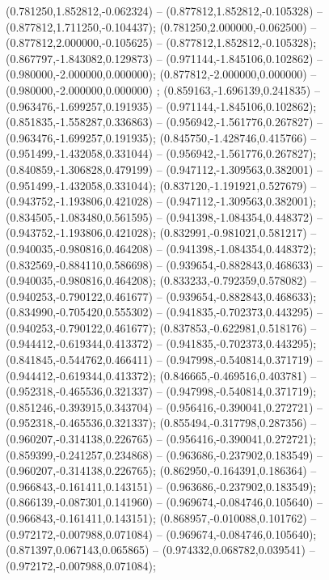  (0.781250,1.852812,-0.062324) -- (0.877812,1.852812,-0.105328) -- (0.877812,1.711250,-0.104437);
 (0.781250,2.000000,-0.062500) -- (0.877812,2.000000,-0.105625) -- (0.877812,1.852812,-0.105328);
 (0.867797,-1.843082,0.129873) -- (0.971144,-1.845106,0.102862) -- (0.980000,-2.000000,0.000000);
 (0.877812,-2.000000,0.000000) -- (0.980000,-2.000000,0.000000) ;
 (0.859163,-1.696139,0.241835) -- (0.963476,-1.699257,0.191935) -- (0.971144,-1.845106,0.102862);
 (0.851835,-1.558287,0.336863) -- (0.956942,-1.561776,0.267827) -- (0.963476,-1.699257,0.191935);
 (0.845750,-1.428746,0.415766) -- (0.951499,-1.432058,0.331044) -- (0.956942,-1.561776,0.267827);
 (0.840859,-1.306828,0.479199) -- (0.947112,-1.309563,0.382001) -- (0.951499,-1.432058,0.331044);
 (0.837120,-1.191921,0.527679) -- (0.943752,-1.193806,0.421028) -- (0.947112,-1.309563,0.382001);
 (0.834505,-1.083480,0.561595) -- (0.941398,-1.084354,0.448372) -- (0.943752,-1.193806,0.421028);
 (0.832991,-0.981021,0.581217) -- (0.940035,-0.980816,0.464208) -- (0.941398,-1.084354,0.448372);
 (0.832569,-0.884110,0.586698) -- (0.939654,-0.882843,0.468633) -- (0.940035,-0.980816,0.464208);
 (0.833233,-0.792359,0.578082) -- (0.940253,-0.790122,0.461677) -- (0.939654,-0.882843,0.468633);
 (0.834990,-0.705420,0.555302) -- (0.941835,-0.702373,0.443295) -- (0.940253,-0.790122,0.461677);
 (0.837853,-0.622981,0.518176) -- (0.944412,-0.619344,0.413372) -- (0.941835,-0.702373,0.443295);
 (0.841845,-0.544762,0.466411) -- (0.947998,-0.540814,0.371719) -- (0.944412,-0.619344,0.413372);
 (0.846665,-0.469516,0.403781) -- (0.952318,-0.465536,0.321337) -- (0.947998,-0.540814,0.371719);
 (0.851246,-0.393915,0.343704) -- (0.956416,-0.390041,0.272721) -- (0.952318,-0.465536,0.321337);
 (0.855494,-0.317798,0.287356) -- (0.960207,-0.314138,0.226765) -- (0.956416,-0.390041,0.272721);
 (0.859399,-0.241257,0.234868) -- (0.963686,-0.237902,0.183549) -- (0.960207,-0.314138,0.226765);
 (0.862950,-0.164391,0.186364) -- (0.966843,-0.161411,0.143151) -- (0.963686,-0.237902,0.183549);
 (0.866139,-0.087301,0.141960) -- (0.969674,-0.084746,0.105640) -- (0.966843,-0.161411,0.143151);
 (0.868957,-0.010088,0.101762) -- (0.972172,-0.007988,0.071084) -- (0.969674,-0.084746,0.105640);
 (0.871397,0.067143,0.065865) -- (0.974332,0.068782,0.039541) -- (0.972172,-0.007988,0.071084);
